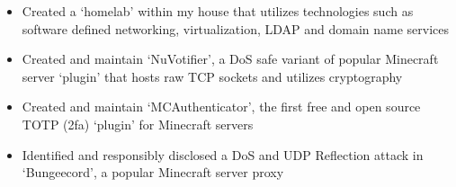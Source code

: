 \begin{itemize}
    \item Created a `homelab' within my house that utilizes technologies such as
        software defined networking, virtualization, LDAP and domain name
        services
    \item Created and maintain `NuVotifier', a DoS safe variant of popular
        Minecraft server `plugin' that hosts raw TCP sockets and utilizes
        cryptography
    \item Created and maintain `MCAuthenticator', the first free and open source
        TOTP (2fa) `plugin' for Minecraft servers
    \item Identified and responsibly disclosed a DoS and UDP Reflection attack
        in `Bungeecord', a popular Minecraft server proxy
\end{itemize}
